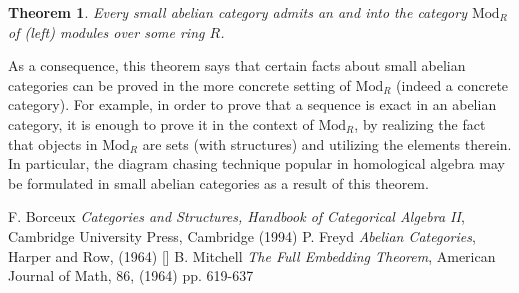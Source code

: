 \documentclass[12pt]{article}
\newtheorem{thm}{Theorem}
\begin{document}
\begin{thm}  Every small abelian category admits an  and   into the category \textbf{$\mbox{Mod}_R$} of (left) modules over some ring $R$.
\end{thm}

As a consequence, this theorem says that certain facts about small abelian categories can be proved in the more concrete setting of $\mbox{Mod}_R$ (indeed a concrete category).  For example, in order to prove that a sequence is exact in an abelian category, it is enough to prove it in the context of $\mbox{Mod}_R$, by realizing the fact that objects in $\mbox{Mod}_R$ are sets (with structures) and utilizing the elements therein.  In particular, the diagram chasing technique popular in homological algebra may be formulated in small abelian categories as a result of this theorem.

\begin{thebibliography}{9}
 F. Borceux \emph{Categories and Structures, Handbook of Categorical Algebra II}, Cambridge University Press, Cambridge (1994)
 P. Freyd \emph{Abelian Categories}, Harper and Row, (1964) []
 B. Mitchell \emph{The Full Embedding Theorem}, American Journal of Math, 86, (1964) pp. 619-637
\end{thebibliography}
\end{document}
